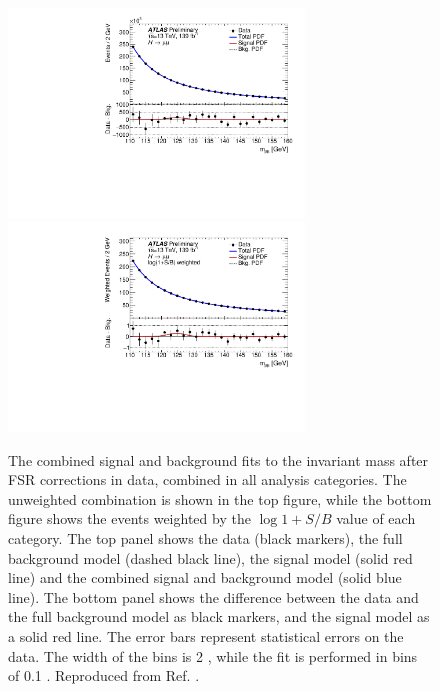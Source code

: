 \begin{figure}[h!]
  \centering
  \includegraphics[width=0.7\textwidth]{figures/hmumu/fits/inclusive}
  \includegraphics[width=0.7\textwidth]{figures/hmumu/fits/inclusive_w}
  \caption[Combined signal and background fit to data]{
  The combined signal and background fits to the invariant mass after FSR
  corrections in data, combined in all analysis categories.
  The unweighted combination is shown in the top figure, while the
  bottom figure shows the events weighted by the $\log{1 + S/B}$
  value of each category. The top panel shows the data (black
  markers), the full background model (dashed black line), the signal
  model (solid red line) and the combined signal and background model
  (solid blue line). The bottom panel shows the difference between the data
  and the full background model as black markers, and the signal model
  as a solid red line. The error bars represent statistical errors on
  the data. The width of the bins is 2 \GeV, while the fit is
  performed in bins of 0.1 \GeV.
  Reproduced from Ref. \cite{ATLAS-CONF-2019-028}.
  }
  \label{fig:hmumu:fit-combination}
\end{figure}

